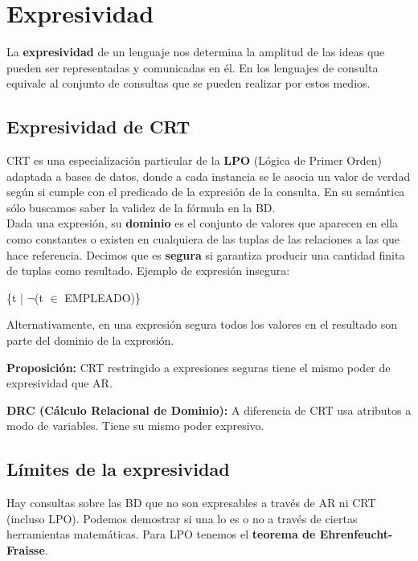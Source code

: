 \section*{Expresividad}
La \textbf{expresividad} de un lenguaje nos determina la amplitud de las ideas que pueden ser representadas y comunicadas en él. En los lenguajes de consulta equivale al conjunto de consultas que se pueden realizar por estos medios.

\subsection*{Expresividad de CRT}
CRT es una especialización particular de la \textbf{LPO} (Lógica de Primer Orden) adaptada a bases de datos, donde a cada instancia se le asocia un valor de verdad según si cumple con el predicado de la expresión de la consulta. En su semántica sólo buscamos saber la validez de la fórmula en la BD. \\
Dada una expresión, su \textbf{dominio} es el conjunto de valores que aparecen en ella como constantes o existen en cualquiera de las tuplas de las relaciones a las que hace referencia. Decimos que es \textbf{segura} si garantiza producir una cantidad finita de tuplas como resultado. Ejemplo de expresión insegura:
\begin{SQL}
    \{t | $\lnot$(t $\in$ EMPLEADO)\}
\end{SQL}
Alternativamente, en una expresión segura todos los valores en el resultado son parte del dominio de la expresión.

\textbf{Proposición:} CRT restringido a expresiones seguras tiene el mismo poder de expresividad que AR.

\textbf{DRC (Cálculo Relacional de Dominio):} A diferencia de CRT usa atributos a modo de variables. Tiene su mismo poder expresivo.

\subsection*{Límites de la expresividad}
Hay consultas sobre las BD que no son expresables a través de AR ni CRT (incluso LPO). Podemos demostrar si una lo es o no a través de ciertas herramientas matemáticas. Para LPO tenemos el \textbf{teorema de Ehrenfeucht-Fraisse}.

